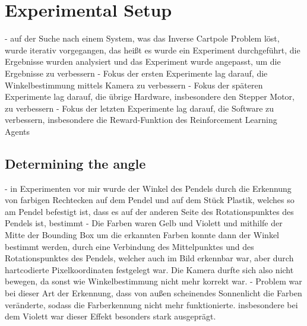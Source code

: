 \chapter{Experimental Setup}

- auf der Suche nach einem System, was das Inverse Cartpole Problem löst, wurde iterativ vorgegangen, das heißt es wurde ein Experiment durchgeführt, die Ergebnisse wurden analysiert und das Experiment wurde angepasst, um die Ergebnisse zu verbessern
- Fokus der ersten Experimente lag darauf, die Winkelbestimmung mittels Kamera zu verbessern
- Fokus der späteren Experimente lag darauf, die übrige Hardware, insbesondere den Stepper Motor, zu verbessern
- Fokus der letzten Experimente lag darauf, die Software zu verbessern, insbesondere die Reward-Funktion des Reinforcement Learning Agents

\section{Determining the angle}
- in Experimenten vor mir wurde der Winkel des Pendels durch die Erkennung von farbigen Rechtecken auf dem Pendel und auf dem Stück Plastik, welches so am Pendel befestigt ist, dass es auf der anderen Seite des Rotationspunktes des Pendels ist, bestimmt
- Die Farben waren Gelb und Violett und mithilfe der Mitte der Bounding Box um die erkannten Farben konnte dann der Winkel bestimmt werden, durch eine Verbindung des Mittelpunktes und des Rotationspunktes des Pendels, welcher auch im Bild erkennbar war, aber durch hartcodierte Pixelkoordinaten festgelegt war. Die Kamera durfte sich also nicht bewegen, da sonst wie Winkelbestimmung nicht mehr korrekt war.
- Problem war bei dieser Art der Erkennung, dass von außen scheinendes Sonnenlicht die Farben veränderte, sodass die Farberkennung nicht mehr funktionierte. insbesondere bei dem Violett war dieser Effekt besonders stark ausgeprägt.

